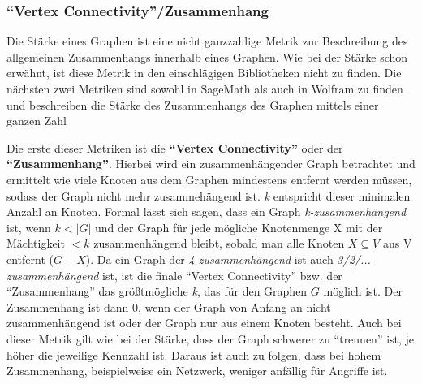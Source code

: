 \documentclass[a4paper,12pt,ngerman,chapterprefix=false,listof=totoc,bibliography=totoc]{scrreprt}
\begin{document}
\subsubsection*{"`Vertex Connectivity"'/Zusammenhang}
{
Die Stärke eines Graphen ist eine nicht ganzzahlige Metrik zur Beschreibung des allgemeinen Zusammenhangs innerhalb eines Graphen. Wie bei der Stärke schon erwähnt, ist diese Metrik in den einschlägigen Bibliotheken nicht zu finden. Die nächsten zwei Metriken sind sowohl in SageMath als auch in Wolfram zu finden und beschreiben die Stärke des Zusammenhangs des Graphen mittels einer ganzen Zahl \cite{sagemath_graph_2020,wolfram_graph_2020}

Die erste dieser Metriken ist die \textbf{"`Vertex Connectivity"'} oder der \textbf{"`Zusammenhang"'}. Hierbei wird ein zusammenhängender Graph betrachtet und ermittelt wie viele Knoten aus dem Graphen mindestens entfernt werden müssen, sodass der Graph nicht mehr zusammehängend ist. \textit{k} entspricht dieser minimalen Anzahl an Knoten. Formal lässt sich sagen, dass ein Graph \textit{k-zusammenhängend} ist, wenn \(k <\vert G\vert\) und der Graph für jede mögliche Knotenmenge X mit der Mächtigkeit \(< k\) zusammenhängend bleibt, sobald man alle Knoten \(X\subseteq V\) aus V entfernt (\(G - X\)). Da ein Graph der \textit{4-zusammenhängend} ist auch \textit{3/2/...-zusammenhängend} ist, ist die finale "`Vertex Connectivity"' bzw.  der "`Zusammenhang"' das größtmögliche \textit{k}, das für den Graphen \(G\) möglich ist. Der Zusammenhang ist dann 0, wenn der Graph von Anfang an nicht zusammenhängend ist oder der Graph nur aus einem Knoten besteht. \cite{diestel_graphentheorie_2000} Auch bei dieser Metrik gilt wie bei der Stärke, dass der Graph schwerer zu "`trennen"' ist, je höher die jeweilige Kennzahl ist. Daraus ist auch zu folgen, dass bei hohem Zusammenhang, beispielweise ein Netzwerk, weniger anfällig für Angriffe ist.

}
\end{document}
